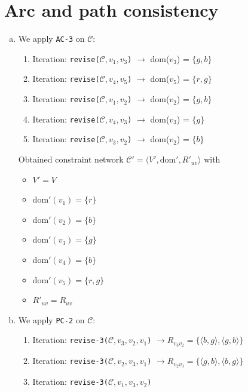 \documentclass{article} %
\begin{document}
\section{Arc and path consistency}
\begin{enumerate}[(a)]
    \item We apply \texttt{AC-3} on $\mathcal{C}$:
    \begin{enumerate}[1.]
        \item Iteration: \texttt{revise($\mathcal{C}, v_1, v_3$)} $\rightarrow$ 
        dom($v_3$) = $\{ g, b \}$
        \item Iteration: \texttt{revise($\mathcal{C}, v_4, v_5$)} $\rightarrow$ 
        dom($v_5$) = $\{ r, g \}$
        \item Iteration: \texttt{revise($\mathcal{C}, v_1, v_2$)} $\rightarrow$ 
        dom($v_2$) = $\{ g, b \}$
        \item Iteration: \texttt{revise($\mathcal{C}, v_4, v_3$)} $\rightarrow$ 
        dom($v_3$) = $\{ g \}$
        \item Iteration: \texttt{revise($\mathcal{C}, v_3, v_2$)} $\rightarrow$ 
        dom($v_2$) = $\{ b \}$
    \end{enumerate}
    Obtained constraint network $\mathcal{C}' =
    \langle V', \text{dom}', R'_{uv} \rangle$ with
    \begin{itemize}
        \item $V' = V$
        \item dom$'(v_1) = \{ r \}$
        \item dom$'(v_2) = \{ b \}$
        \item dom$'(v_3) = \{ g \}$
        \item dom$'(v_4) = \{ b \}$
        \item dom$'(v_5) = \{ r, g \}$
        \item $R'_{uv} = R_{uv}$
    \end{itemize}
    \item We apply \texttt{PC-2} on $\mathcal{C}$:
    \begin{enumerate}[1.]
        \item Iteration: \texttt{revise-3($\mathcal{C}, v_3, v_2, v_1$)}
        $\rightarrow R_{v_3 v_2} = \{
            \langle b, g \rangle,
            \langle g, b \rangle
        \}$
        \item Iteration: \texttt{revise-3($\mathcal{C}, v_2, v_3, v_1$)}
        $\rightarrow R_{v_2 v_3} = \{
            \langle g, b \rangle,
            \langle b, g \rangle
        \}$
        \item Iteration: \texttt{revise-3($\mathcal{C}, v_1, v_3, v_2$)}

\end{enumerate}
\end{enumerate}
\end{document}
